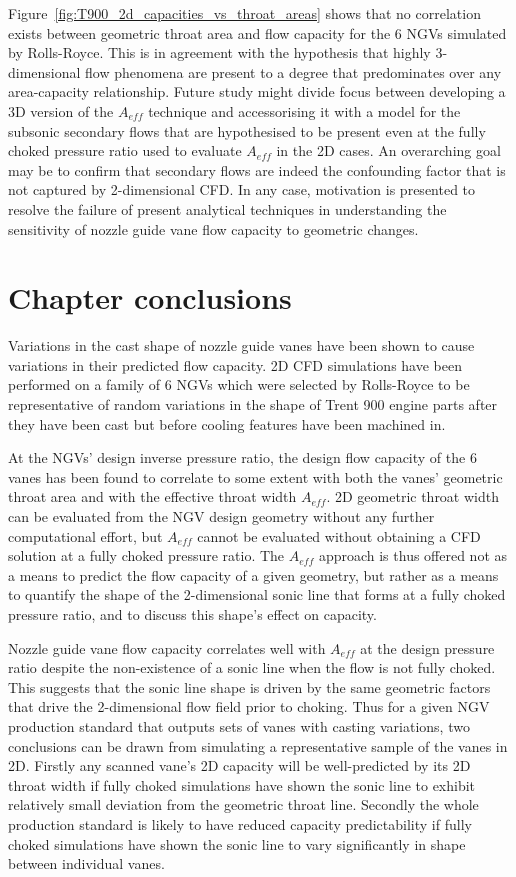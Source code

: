 \documentclass[a4paper, 11pt, oneside]{report}
\begin{document}
Figure~\ref{fig:T900_2d_capacities_vs_throat_areas} shows that no correlation exists between geometric throat area and flow capacity for the 6 NGVs simulated by Rolls-Royce. This is in agreement with the hypothesis that highly 3-dimensional flow phenomena are present to a degree that predominates over any area-capacity relationship. Future study might divide focus between developing a 3D version of the $A_{eff}$ technique and accessorising it with a model for the subsonic secondary flows that are hypothesised to be present even at the fully choked pressure ratio used to evaluate $A_{eff}$ in the 2D cases. An overarching goal may be to confirm that secondary flows are indeed the confounding factor that is not captured by 2-dimensional CFD. In any case, motivation is presented to resolve the failure of present analytical techniques in understanding the sensitivity of nozzle guide vane flow capacity to geometric changes.

\section{Chapter conclusions}

Variations in the cast shape of nozzle guide vanes have been shown to cause variations in their predicted flow capacity. 2D CFD simulations have been performed on a family of 6 NGVs which were selected by Rolls-Royce to be representative of random variations in the shape of Trent 900 engine parts after they have been cast but before cooling features have been machined in. 

At the NGVs' design inverse pressure ratio, the design flow capacity of the 6 vanes has been found to correlate to some extent with both the vanes' geometric throat area and with the effective throat width $A_{eff}$. 2D geometric throat width can be evaluated from the NGV design geometry without any further computational effort, but $A_{eff}$ cannot be evaluated without obtaining a CFD solution at a fully choked pressure ratio. The $A_{eff}$ approach is thus offered not as a means to predict the flow capacity of a given geometry, but rather as a means to quantify the shape of the 2-dimensional sonic line that forms at a fully choked pressure ratio, and to discuss this shape's effect on capacity.

Nozzle guide vane flow capacity correlates well with $A_{eff}$ at the design pressure ratio despite the non-existence of a sonic line when the flow is not fully choked. This suggests that the sonic line shape is driven by the same geometric factors that drive the 2-dimensional flow field prior to choking. Thus for a given NGV production standard that outputs sets of vanes with casting variations, two conclusions can be drawn from simulating a representative sample of the vanes in 2D. Firstly any scanned vane's 2D capacity will be well-predicted by its 2D throat width if fully choked simulations have shown the sonic line to exhibit relatively small deviation from the geometric throat line. Secondly the whole production standard is likely to have reduced capacity predictability if fully choked simulations have shown the sonic line to vary significantly in shape between individual vanes.
\end{document}

